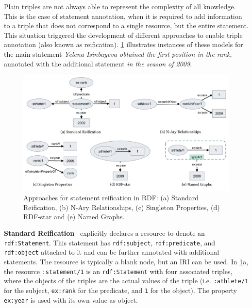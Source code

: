 
Plain triples are not always able to represent the complexity of all knowledge. This is the case of statement annotation, when it is required to add information to a triple that does not correspond to a single resource, but the entire statement. This situation triggered the development of different approaches to enable triple annotation (also known as reification). \cref{fig:chp2_reification} illustrates instances of these models for the main statement \textit{Yelena Isinbayeva obtained the first position in the rank}, annotated with the additional statement \textit{in the season of 2009}. 

\begin{figure}[t]
\centering
\includegraphics[width=\linewidth]{figures/chp2_reifications.pdf}
\caption[Approaches for statement reification in RDF]{Approaches for statement reification in RDF: (a) Standard Reification, (b) N-Ary Relationships, (c) Singleton Properties, (d) RDF-star and (e) Named Graphs.}
\label{fig:chp2_reification}
\end{figure}

\noindent\textbf{Standard Reification}~\parencite{lassila1999rdf} explicitly declares a resource to denote an \texttt{rdf:Statement}.
This statement has \texttt{rdf:subject}, \texttt{rdf:predicate}, and \texttt{rdf:object} attached to it and can be further annotated with additional statements. The resource is typically a blank node, but an IRI can be used. 
In \cref{fig:chp2_reification}a, the resource \texttt{:statement/1} is an \texttt{rdf:Statement} with four associated triples, where the objects of the triples are the actual values of the triple (i.e. \texttt{:athlete/1} for the subject, \texttt{ex:rank} for the predicate, and \texttt{1} for the object). The property \texttt{ex:year} is used with its own value as object.



